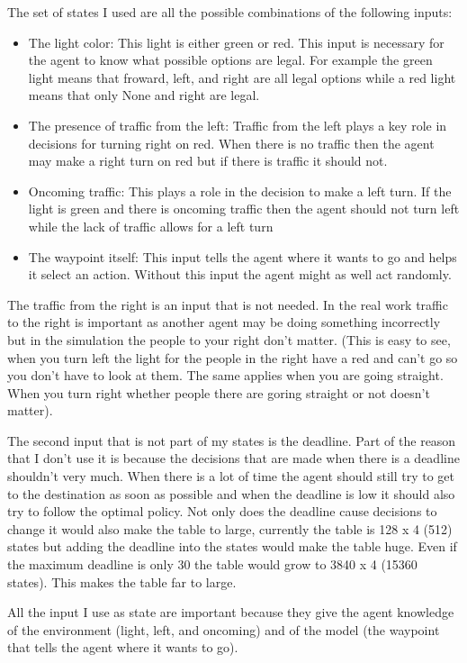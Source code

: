 \documentclass{article}
\begin{document}
The set of states I used are all the possible combinations of the following inputs:
\begin{itemize}
  \item The light color: This light is either green or red. This input is necessary for the agent to know what possible options are legal. For example the green light means that froward, left, and right are all legal options while a red light means that only None and right are legal. 
  \item The presence of traffic from the left: Traffic from the left plays a key role in decisions for turning right on red. When there is no traffic then the agent may make a right turn on red but if there is traffic it should not.
  \item Oncoming traffic: This plays a role in the decision to make a left turn. If the light is green and there is oncoming traffic then the agent should not turn left while the lack of traffic allows for a left turn
  \item The waypoint itself: This input tells the agent where it wants to go and helps it select an action. Without this input the agent might as well act randomly.
\end{itemize} 
The traffic from the right is an input that is not needed. In the real work traffic to the right is important as another agent may be doing something incorrectly but in the simulation the people to your right don't matter. (This is easy to see, when you turn left the light for the people in the right have a red and can't go so you don't have to look at them. The same applies when you are going straight. When you turn right whether people there are goring straight or not doesn't matter). 

The second input that is not part of my states is the deadline. Part of the reason that I don't use it is because the decisions that are made when there is a deadline shouldn't very much. When there is a lot of time the agent should still try to get to the destination as soon as possible and when the deadline is low it should also try to follow the optimal policy. Not only does the deadline cause decisions to change it would also make the table to large, currently the table is 128 x 4 (512) states but adding the deadline into the states would make the table huge. Even if the maximum deadline is only 30 the table would grow to 3840 x 4 (15360 states). This makes the table far to large.

All the input I use as state are important because they give the agent knowledge of the environment (light, left, and oncoming) and of the model (the waypoint that tells the agent where it wants to go).
\end{document}
